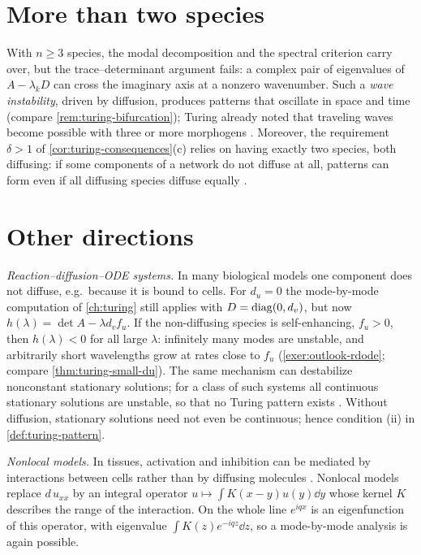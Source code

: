 \section{More than two species}\label{sec:outlook-more-species}

With $n\ge3$ species, the modal decomposition and the spectral criterion carry over,
but the trace--determinant argument fails: a complex pair of eigenvalues of
$A-\lambda_kD$ can cross the imaginary axis at a nonzero wavenumber. Such a
\emph{wave instability}, driven by diffusion, produces patterns that oscillate in
space and time (compare \cref{rem:turing-bifurcation}); Turing already noted that
traveling waves become possible with three or more morphogens \cite{Turing1952}.
Moreover, the requirement $\delta>1$ of \cref{cor:turing-consequences}(c) relies on
having exactly two species, both diffusing: if some components of a network do not
diffuse at all, patterns can form even if all diffusing species diffuse equally
\cite{Marcon2016}.

\section{Other directions}\label{sec:outlook-other}

\emph{Reaction--diffusion--ODE systems.} In many biological models one component
does not diffuse, e.g.\ because it is bound to cells. For $d_u=0$ the mode-by-mode
computation of \cref{ch:turing} still applies with $D=\operatorname{diag}(0,d_v)$, but now
$h(\lambda)=\det A-\lambda d_vf_u$. If the non-diffusing species is self-enhancing,
$f_u>0$, then $h(\lambda)<0$ for all large $\lambda$: infinitely many modes are
unstable, and arbitrarily short wavelengths grow at rates close to $f_u$
(\cref{exer:outlook-rdode}; compare \cref{thm:turing-small-du}). The same
mechanism can destabilize nonconstant stationary solutions; for a class of such
systems all continuous stationary solutions are unstable, so that no Turing pattern
exists \cite{MarciniakKarchSuzuki2017}. Without diffusion, stationary solutions need
not even be continuous; hence condition (ii) in \cref{def:turing-pattern}.

\emph{Nonlocal models.} In tissues, activation and inhibition can be mediated by
interactions between cells rather than by diffusing molecules \cite{KondoMiura2010}.
Nonlocal models replace $d\,u_{xx}$ by an integral operator
$u\mapsto\int K(x-y)u(y)\dd y$ whose kernel $K$ describes the range of the
interaction. On the whole line $e^{iqx}$ is an eigenfunction of this operator, with
eigenvalue $\int K(z)e^{-iqz}\dd z$, so a mode-by-mode analysis is again possible.

